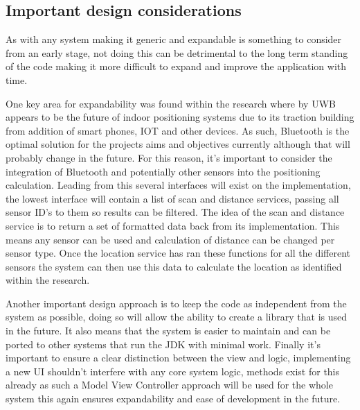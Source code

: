 \subsection{Important design considerations}
As with any system making it generic and expandable is something to consider from an early stage, not doing this can be detrimental to the long term standing of the code making it more difficult to expand and improve the application with time.

One key area for expandability was found within the research where by UWB appears to be the future of indoor positioning systems due to its traction building from addition of smart phones, IOT and other devices. As such, Bluetooth is the optimal solution for the projects aims and objectives currently although that will probably change in the future. For this reason, it's important to consider the integration of Bluetooth and potentially other sensors into the positioning calculation. Leading from this several interfaces will exist on the implementation, the lowest interface will contain a list of scan and distance services, passing all sensor ID's to them so results can be filtered. The idea of the scan and distance service is to return a set of formatted data back from its implementation. This means any sensor can be used and calculation of distance can be changed per sensor type. Once the location service has ran these functions for all the different sensors the system can then use this data to calculate the location as identified within the research.

Another important design approach is to keep the code as independent from the system as possible, doing so will allow the ability to create a library that is used in the future. It also means that the system is easier to maintain and can be ported to other systems that run the JDK with minimal work. Finally it's important to ensure a clear distinction between the view and logic, implementing a new UI shouldn't interfere with any core system logic, methods exist for this already as such a Model View Controller approach will be used for the whole system this again ensures expandability and ease of development in the future.